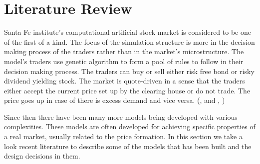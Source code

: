 \section{Literature Review}

Santa Fe institute's computational artificial stock 
market is considered to be one of the first of a kind. 
The focus of the simulation structure is more in the 
decision making process of the traders rather than in the 
market's microstructure. The model's traders use 
genetic algorithm to form a pool of rules to follow
in their decision making process. The traders can buy or
sell either risk free bond or risky dividend yielding stock.
The market is quote-driven in a sense that the traders
either accept the current price set up by the clearing house
or do not trade. The price goes up in case of there is excess
demand and vice versa. (\citeauthor{SantaFe94}, \citeyear{SantaFe94} 
and \citeauthor{SantaFe99}, \citeyear{SantaFe99})

Since then there have been many more models being 
developed with various complexities. These models are often developed
for achieving specific properties of a real market, 
usually related to the price formation. In this section
we take a look recent literature to describe some of the models
that has been built and the design decisions in them.


\citep{Ben12}